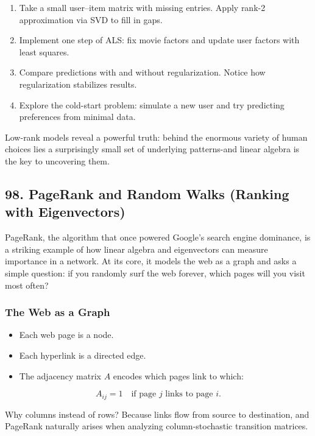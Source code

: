\documentclass[
  letterpaper,
  DIV=11,
  numbers=noendperiod]{scrreprt}
\providecommand{\tightlist}{%
  \setlength{\itemsep}{0pt}\setlength{\parskip}{0pt}}
\begin{document}
\begin{enumerate}
\def\labelenumi{\arabic{enumi}.}
\tightlist
\item
  Take a small user--item matrix with missing entries. Apply rank-2
  approximation via SVD to fill in gaps.
\item
  Implement one step of ALS: fix movie factors and update user factors
  with least squares.
\item
  Compare predictions with and without regularization. Notice how
  regularization stabilizes results.
\item
  Explore the cold-start problem: simulate a new user and try predicting
  preferences from minimal data.
\end{enumerate}

Low-rank models reveal a powerful truth: behind the enormous variety of
human choices lies a surprisingly small set of underlying patterns-and
linear algebra is the key to uncovering them.

\subsection{98. PageRank and Random Walks (Ranking with
Eigenvectors)}\label{pagerank-and-random-walks-ranking-with-eigenvectors}

PageRank, the algorithm that once powered Google's search engine
dominance, is a striking example of how linear algebra and eigenvectors
can measure importance in a network. At its core, it models the web as a
graph and asks a simple question: if you randomly surf the web forever,
which pages will you visit most often?

\subsubsection{The Web as a Graph}\label{the-web-as-a-graph}

\begin{itemize}
\tightlist
\item
  Each web page is a node.
\item
  Each hyperlink is a directed edge.
\item
  The adjacency matrix \(A\) encodes which pages link to which:
\end{itemize}

\[
A_{ij} = 1 \quad \text{if page \(j\) links to page \(i\)}.
\]

Why columns instead of rows? Because links flow from source to
destination, and PageRank naturally arises when analyzing
column-stochastic transition matrices.
\end{document}
